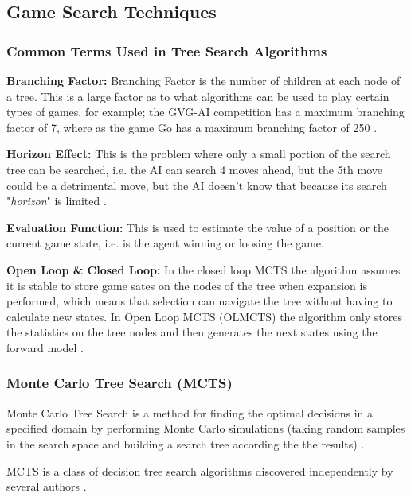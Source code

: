 \documentclass[journal]{IEEEtran}
\begin{document}
	\subsection{Game Search Techniques} \label{ssec:GST}
		\subsubsection{Common Terms Used in Tree Search Algorithms} \label{sssec:Common}

		\textbf{Branching Factor:}
			Branching Factor is the number of children at each node of a tree. This is a large factor as to what algorithms can be used to play certain types of games, for example; the GVG-AI competition has a maximum branching factor of 7, where as the game Go has a maximum branching factor of 250 \cite{silver2016mastering, perez20162014}.

		\textbf{Horizon Effect:}
			This is the problem where only a small portion of the search tree can be searched, i.e. the AI can search 4 moves ahead, but the 5th move could be a detrimental move, but the AI doesn't know that because its search "\textit{horizon}" is limited \cite{joppen2017informed}.

		\textbf{Evaluation Function:}
			This is used to estimate the value of a position or the current game state, i.e. is the agent winning or loosing the game.
			
		\textbf{Open Loop \& Closed Loop:}
			In the closed loop MCTS the algorithm assumes it is stable to store game sates on the nodes of the tree when expansion is performed, which means that selection can navigate the tree without having to calculate new states.
			In Open Loop MCTS (OLMCTS) the algorithm only stores the statistics on the tree nodes and then generates the next states using the forward model \cite{perez2016analyzing, perez2015open}.
			
		
		
		\subsubsection{Monte Carlo Tree Search (MCTS) }\label{sssec:MCTS}

		Monte Carlo Tree Search is a method for finding the optimal decisions in a specified domain by performing Monte Carlo simulations (taking random samples in the search space and building a search tree according the the results) \cite{browne2012survey}. 

		MCTS is a class of decision tree search algorithms discovered independently by several authors \cite{coulom2006efficient, kocsis2006bandit, chaslot2006monte}.
		
\end{document}
